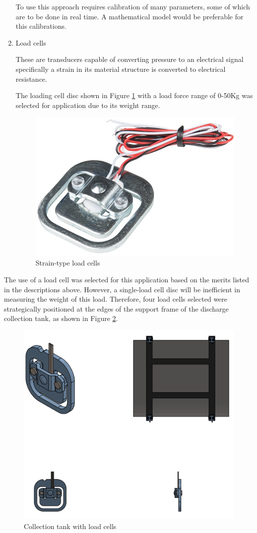 \begin{enumerate}
    To use this approach requires calibration of many parameters, some of which are to be done in real time. A mathematical model would be preferable for this calibrations.
    \item Load cells
    \par
    These are transducers capable of converting pressure to an electrical signal specifically a strain in its material structure is converted to electrical resistance.
    \par
    The loading cell disc shown in Figure \ref{fig:load_cell_disc} with a load force range of 0-50Kg was selected for application due to its weight range.
    \begin{figure}[H]
        \centering
        \includegraphics[width=.25\textwidth, height=.25\textheight]{Figures/50KgLoadCell.jpg}
        \caption[Strain-type load cells]{Strain-type load cells \cite{loadcell}}
        \label{fig:load_cell_disc}
    \end{figure}
\end{enumerate}
The use of a load cell was selected for this application based on the merits listed in the descriptions above. However, a single-load cell disc will be inefficient in measuring the weight of this load. Therefore, four load cells selected were strategically positioned at the edges of the support frame of the discharge collection tank, as shown in Figure \ref{fig:collection_tank_with_load_cells}.
\begin{figure}[H]
    \centering
    \includegraphics[height=.45\textheight]{Figures/CollectionTankWithTheLoadCells.PNG}
    \caption{Collection tank with load cells}
    \label{fig:collection_tank_with_load_cells}
\end{figure}


